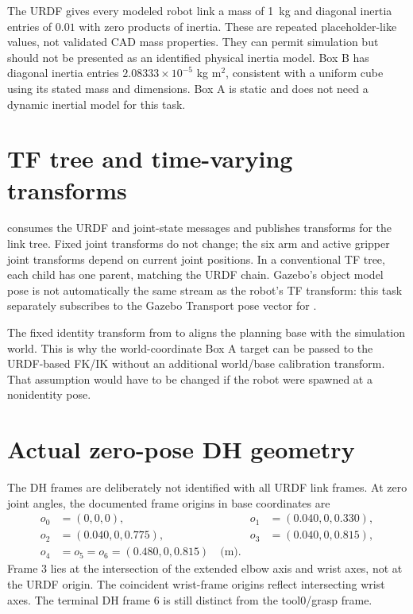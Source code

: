 The URDF gives every modeled robot link a mass of \SI{1}{kg} and diagonal
inertia entries of $0.01$ with zero products of inertia. These are repeated
placeholder-like values, not validated CAD mass properties. They can permit
simulation but should not be presented as an identified physical inertia
model. Box B has diagonal inertia entries $2.08333\times10^{-5}$ kg m$^2$,
consistent with a uniform cube using its stated mass and dimensions. Box A is
static and does not need a dynamic inertial model for this task.

\section{TF tree and time-varying transforms}
 consumes the URDF and joint-state messages and
publishes transforms for the link tree. Fixed joint transforms do not change;
the six arm and active gripper joint transforms depend on current joint
positions. In a conventional TF tree, each child has one parent, matching the
URDF chain. Gazebo's object model pose is not automatically the same stream as
the robot's TF transform: this task separately subscribes to the Gazebo
Transport pose vector for .

The fixed identity transform from  to  aligns
the planning base with the simulation world. This is why the world-coordinate
Box A target can be passed to the URDF-based FK/IK without an additional
world/base calibration transform. That assumption would have to be changed if
the robot were spawned at a nonidentity pose.

\section{Actual zero-pose DH geometry}
The DH frames are deliberately not identified with all URDF link frames. At
zero joint angles, the documented frame origins in base coordinates are
\begin{align*}
 o_0&=(0,0,0), &o_1&=(0.040,0,0.330),\\
 o_2&=(0.040,0,0.775), &o_3&=(0.040,0,0.815),\\
 o_4&=o_5=o_6=(0.480,0,0.815)\quad\text{(m)}.
\end{align*}
Frame 3 lies at the intersection of the extended elbow axis and wrist axes,
not at the URDF  origin. The coincident wrist-frame origins
reflect intersecting wrist axes. The terminal DH frame 6 is still distinct
from the tool0/grasp frame.

